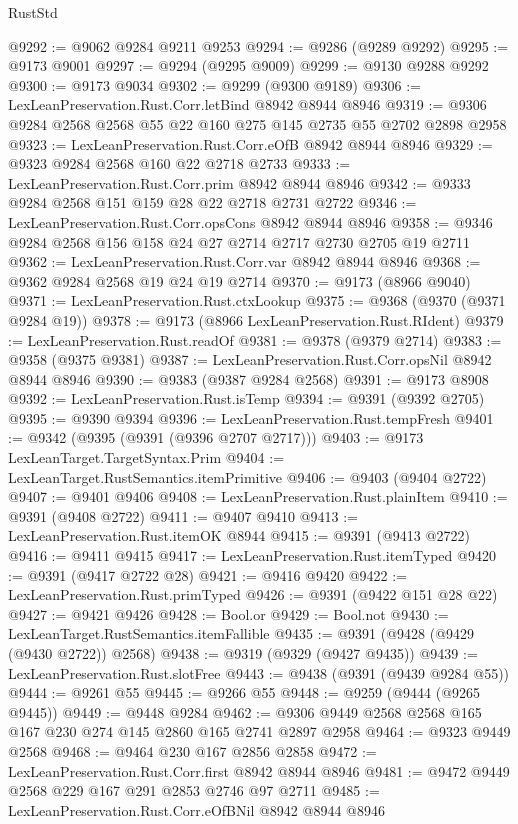 \begin{lexlean}{RustStd}
\begin{coremodule}
@9292 := @9062 @9284 @9211 @9253
@9294 := @9286 (@9289 @9292)
@9295 := @9173 @9001
@9297 := @9294 (@9295 @9009)
@9299 := @9130 @9288 @9292
@9300 := @9173 @9034
@9302 := @9299 (@9300 @9189)
@9306 := LexLeanPreservation.Rust.Corr.letBind @8942 @8944 @8946
@9319 := @9306 @9284 @2568 @2568 @55 @22 @160 @275 @145 @2735 @55 @2702 @2898 @2958
@9323 := LexLeanPreservation.Rust.Corr.eOfB @8942 @8944 @8946
@9329 := @9323 @9284 @2568 @160 @22 @2718 @2733
@9333 := LexLeanPreservation.Rust.Corr.prim @8942 @8944 @8946
@9342 := @9333 @9284 @2568 @151 @159 @28 @22 @2718 @2731 @2722
@9346 := LexLeanPreservation.Rust.Corr.opsCons @8942 @8944 @8946
@9358 := @9346 @9284 @2568 @156 @158 @24 @27 @2714 @2717 @2730 @2705 @19 @2711
@9362 := LexLeanPreservation.Rust.Corr.var @8942 @8944 @8946
@9368 := @9362 @9284 @2568 @19 @24 @19 @2714
@9370 := @9173 (@8966 @9040)
@9371 := LexLeanPreservation.Rust.ctxLookup
@9375 := @9368 (@9370 (@9371 @9284 @19))
@9378 := @9173 (@8966 LexLeanPreservation.Rust.RIdent)
@9379 := LexLeanPreservation.Rust.readOf
@9381 := @9378 (@9379 @2714)
@9383 := @9358 (@9375 @9381)
@9387 := LexLeanPreservation.Rust.Corr.opsNil @8942 @8944 @8946
@9390 := @9383 (@9387 @9284 @2568)
@9391 := @9173 @8908
@9392 := LexLeanPreservation.Rust.isTemp
@9394 := @9391 (@9392 @2705)
@9395 := @9390 @9394
@9396 := LexLeanPreservation.Rust.tempFresh
@9401 := @9342 (@9395 (@9391 (@9396 @2707 @2717)))
@9403 := @9173 LexLeanTarget.TargetSyntax.Prim
@9404 := LexLeanTarget.RustSemantics.itemPrimitive
@9406 := @9403 (@9404 @2722)
@9407 := @9401 @9406
@9408 := LexLeanPreservation.Rust.plainItem
@9410 := @9391 (@9408 @2722)
@9411 := @9407 @9410
@9413 := LexLeanPreservation.Rust.itemOK @8944
@9415 := @9391 (@9413 @2722)
@9416 := @9411 @9415
@9417 := LexLeanPreservation.Rust.itemTyped
@9420 := @9391 (@9417 @2722 @28)
@9421 := @9416 @9420
@9422 := LexLeanPreservation.Rust.primTyped
@9426 := @9391 (@9422 @151 @28 @22)
@9427 := @9421 @9426
@9428 := Bool.or
@9429 := Bool.not
@9430 := LexLeanTarget.RustSemantics.itemFallible
@9435 := @9391 (@9428 (@9429 (@9430 @2722)) @2568)
@9438 := @9319 (@9329 (@9427 @9435))
@9439 := LexLeanPreservation.Rust.slotFree
@9443 := @9438 (@9391 (@9439 @9284 @55))
@9444 := @9261 @55
@9445 := @9266 @55
@9448 := @9259 (@9444 (@9265 @9445))
@9449 := @9448 @9284
@9462 := @9306 @9449 @2568 @2568 @165 @167 @230 @274 @145 @2860 @165 @2741 @2897 @2958
@9464 := @9323 @9449 @2568
@9468 := @9464 @230 @167 @2856 @2858
@9472 := LexLeanPreservation.Rust.Corr.first @8942 @8944 @8946
@9481 := @9472 @9449 @2568 @229 @167 @291 @2853 @2746 @97 @2711
@9485 := LexLeanPreservation.Rust.Corr.eOfBNil @8942 @8944 @8946

\end{coremodule}
\end{lexlean}
